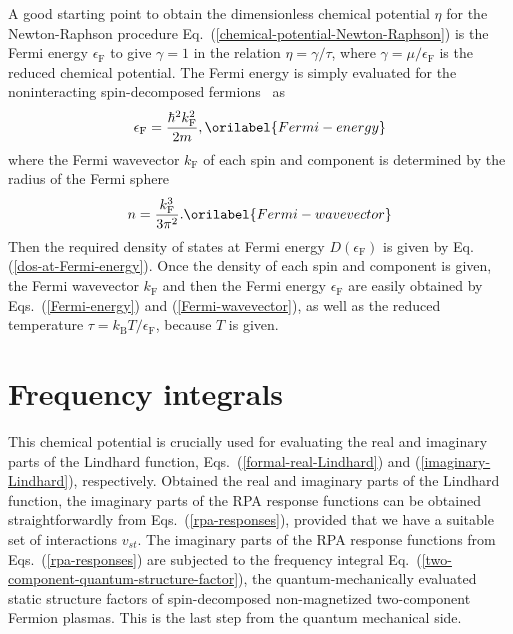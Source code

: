 \documentclass[aps,showkeys,noshowpacs,superscriptaddress,pre,preprint]{revtex4-2}
\let\label\orilabel
\begin{document}
A good starting point to obtain the dimensionless chemical potential $\eta$ 
for the Newton-Raphson procedure Eq.~(\ref{chemical-potential-Newton-Raphson})
is the Fermi energy $\epsilon_\mathrm{F}$ to give 
$\gamma = 1$ in the relation $\eta = \gamma / \tau$,
where $\gamma = \mu / \epsilon_\mathrm{F}$ is the reduced chemical potential.
The Fermi energy is simply evaluated for the noninteracting 
spin-decomposed fermions~\cite{Ashcroft-Mermin1976} as
\begin{equation}
\epsilon_\mathrm{F} = \frac{\hbar^2 k_\mathrm{F}^2}{2 m} ,
\label{Fermi-energy}
\end{equation}
where the Fermi wavevector $k_\mathrm{F}$ of each spin and component
is determined by the radius of the Fermi sphere
\begin{equation}
n = \frac{k_\mathrm{F}^3}{3 \pi^2} .
\label{Fermi-wavevector}
\end{equation}
Then the required density of states at Fermi energy $D ( \epsilon_\mathrm{F} )$ 
is given by Eq. (\ref{dos-at-Fermi-energy}).
Once the density of each spin and component is given,
the Fermi wavevector $k_\mathrm{F}$ and then the Fermi energy $\epsilon_\mathrm{F}$
are easily obtained by Eqs.~(\ref{Fermi-energy}) and (\ref{Fermi-wavevector}),
as well as the reduced temperature $\tau = k_\mathrm{B} T / \epsilon_\mathrm{F}$,
because $T$ is given.

\section{Frequency integrals}
\label{sec:frequency-integrals}

This chemical potential is crucially used for evaluating the real and imaginary parts
of the Lindhard function, Eqs.~(\ref{formal-real-Lindhard}) and (\ref{imaginary-Lindhard}), respectively.
Obtained the real and imaginary parts of the Lindhard function,
the imaginary parts of the RPA response functions can be obtained straightforwardly 
from Eqs.~(\ref{rpa-responses}),
provided that we have a suitable set of interactions $v_{st}$.
The imaginary parts of the RPA response functions from Eqs.~(\ref{rpa-responses})
are subjected to the frequency integral Eq.~(\ref{two-component-quantum-structure-factor}),
the quantum-mechanically evaluated static structure factors of 
spin-decomposed non-magnetized two-component Fermion plasmas.
This is the last step from the quantum mechanical side.
\end{document}
